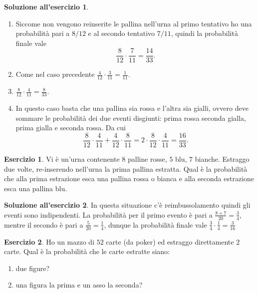 \documentclass[12pt,a4paper]{article}
\theoremstyle{definition}
\newtheorem{sol}{Soluzione all'esercizio}
\newtheorem{exe}{Esercizio}
\begin{document}
\begin{sol}\mbox{}\vspace{-0.7cm}\\
	\begin{enumerate}
		\item Siccome non vengono reinserite le pallina nell'urna al primo tentativo ho una probabilità pari a $ 8/12 $ e al secondo tentativo $ 7/11 $, quindi la probabilità finale vale
		      \[ \frac{8}{12} \cdot \frac{7}{11} = \frac{14}{33}. \]
		\item Come nel caso precedente $ \frac{4}{12} \cdot \frac{3}{11} = \frac{1}{11}. $
		\item $ \frac{8}{12} \cdot \frac{4}{11} = \frac{8}{33}. $
		\item In questo caso basta che una pallina sia rossa e l'altra sia gialli, ovvero deve sommare le probabilità dei due eventi disgiunti: prima rossa seconda gialla, prima gialla e seconda rossa. Da cui
		      \[ \frac{8}{12} \cdot \frac{4}{11} + \frac{4}{12} \cdot \frac{8}{11} = 2 \cdot \frac{8}{12} \cdot \frac{4}{11} = \frac{16}{33}. \]
	\end{enumerate}
\end{sol}

\begin{exe}
	Vi è un'urna contenente $ 8 $ palline rosse, $ 5 $ blu, $ 7 $ bianche. Estraggo due volte,
	re-inserendo nell'urna la prima pallina estratta. Qual è la probabilità che alla
	prima estrazione esca una pallina rossa o bianca e alla seconda estrazione esca
	una pallina blu.
\end{exe}

\begin{sol}
	In questa situazione c'è reimbussolamento quindi gli eventi sono indipendenti. La probabilità per il primo evento è pari a $ \frac{8+7}{20} = \frac34 $, mentre il secondo è pari a $ \frac{5}{20} = \frac14 $, dunque la probabilità finale vale $ \frac34 \cdot \frac14 = \frac{3}{16} $
\end{sol}

\begin{exe}
	Ho un mazzo di $ 52 $ carte (da poker) ed estraggo direttamente $ 2 $ carte. Qual
	è la probabilità che le carte estratte siano:
	\begin{enumerate}
		\item due figure?
		\item una figura la prima e un asso la seconda?
	\end{enumerate}
\end{exe}
\end{document}
